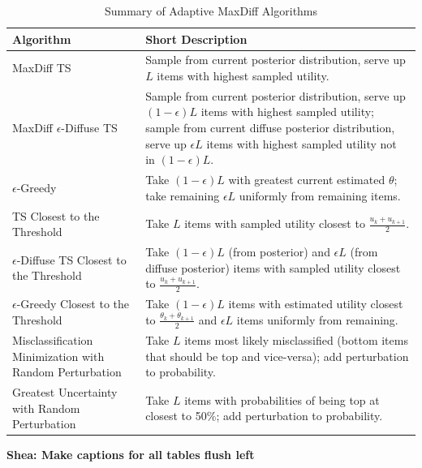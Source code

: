 \documentclass[a4paper,11pt]{article}
\newcommand{\numperset}{L}
\begin{document}
\begin{table}
\caption{Summary of Adaptive MaxDiff Algorithms}
\begin{tabular}{p{5cm}|p{11cm}}
Algorithm & Short Description \\
\hline
MaxDiff TS & Sample from current posterior distribution, serve up $\numperset$ items with highest sampled utility.\\
MaxDiff $\epsilon$-Diffuse TS & Sample from current posterior distribution, serve up $(1-\epsilon)L$ items with highest sampled utility; sample from current diffuse posterior distribution, serve up $\epsilon L$ items with highest sampled utility not in $(1-\epsilon)L$.\\
$\epsilon$-Greedy & Take $(1-\epsilon)L$ with greatest current estimated $\theta$; take remaining $\epsilon L$ uniformly from remaining items.\\
TS Closest to the Threshold & Take $\numperset$ items with sampled utility closest to $\frac{u_k+u_{k+1}}{2}$.\\
$\epsilon$-Diffuse TS Closest to the Threshold & Take $(1-\epsilon)L$ (from posterior) and  $\epsilon L$ (from diffuse posterior) items with sampled utility closest to $\frac{u_k+u_{k+1}}{2}$.\\
$\epsilon$-Greedy Closest to the Threshold & Take $(1-\epsilon)L$ items with estimated utility closest to $\frac{\theta_k+\theta_{k+1}}{2}$ and $\epsilon L$ items uniformly from remaining.\\
Misclassification Minimization with Random Perturbation& Take $\numperset$ items most likely misclassified (bottom items that should be top and vice-versa); add perturbation to probability.\\
Greatest Uncertainty with Random Perturbation& Take $\numperset$ items with probabilities of being top at closest to 50\%; add perturbation to probability.\\
\end{tabular}
\label{methods}
\end{table}

\textbf{Shea: Make captions for all tables flush left}



\end{document}
